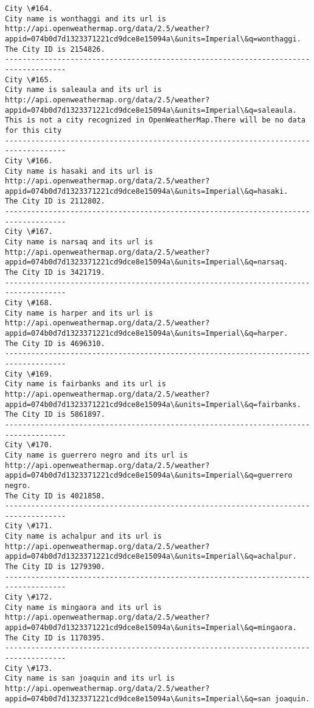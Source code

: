 \documentclass[11pt]{article}
\begin{document}
\begin{Verbatim}[commandchars=\\\{\}]
City \#164.
City name is wonthaggi and its url is http://api.openweathermap.org/data/2.5/weather?appid=074b0d7d1323371221cd9dce8e15094a\&units=Imperial\&q=wonthaggi.
The City ID is 2154826.
------------------------------------------------------------------------------------
City \#165.
City name is saleaula and its url is http://api.openweathermap.org/data/2.5/weather?appid=074b0d7d1323371221cd9dce8e15094a\&units=Imperial\&q=saleaula.
This is not a city recognized in OpenWeatherMap.There will be no data for this city
------------------------------------------------------------------------------------
City \#166.
City name is hasaki and its url is http://api.openweathermap.org/data/2.5/weather?appid=074b0d7d1323371221cd9dce8e15094a\&units=Imperial\&q=hasaki.
The City ID is 2112802.
------------------------------------------------------------------------------------
City \#167.
City name is narsaq and its url is http://api.openweathermap.org/data/2.5/weather?appid=074b0d7d1323371221cd9dce8e15094a\&units=Imperial\&q=narsaq.
The City ID is 3421719.
------------------------------------------------------------------------------------
City \#168.
City name is harper and its url is http://api.openweathermap.org/data/2.5/weather?appid=074b0d7d1323371221cd9dce8e15094a\&units=Imperial\&q=harper.
The City ID is 4696310.
------------------------------------------------------------------------------------
City \#169.
City name is fairbanks and its url is http://api.openweathermap.org/data/2.5/weather?appid=074b0d7d1323371221cd9dce8e15094a\&units=Imperial\&q=fairbanks.
The City ID is 5861897.
------------------------------------------------------------------------------------
City \#170.
City name is guerrero negro and its url is http://api.openweathermap.org/data/2.5/weather?appid=074b0d7d1323371221cd9dce8e15094a\&units=Imperial\&q=guerrero negro.
The City ID is 4021858.
------------------------------------------------------------------------------------
City \#171.
City name is achalpur and its url is http://api.openweathermap.org/data/2.5/weather?appid=074b0d7d1323371221cd9dce8e15094a\&units=Imperial\&q=achalpur.
The City ID is 1279390.
------------------------------------------------------------------------------------
City \#172.
City name is mingaora and its url is http://api.openweathermap.org/data/2.5/weather?appid=074b0d7d1323371221cd9dce8e15094a\&units=Imperial\&q=mingaora.
The City ID is 1170395.
------------------------------------------------------------------------------------
City \#173.
City name is san joaquin and its url is http://api.openweathermap.org/data/2.5/weather?appid=074b0d7d1323371221cd9dce8e15094a\&units=Imperial\&q=san joaquin.

\end{Verbatim}
\end{document}
